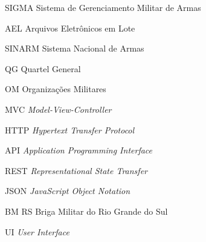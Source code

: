 \begin{siglas}
  \item[SIGMA] Sistema de Gerenciamento Militar de Armas
  \item[AEL] Arquivos Eletrônicos em Lote 
  \item[SINARM] Sistema Nacional de Armas 
  \item[QG] Quartel General
  \item[OM] Organizações Militares
  \item[MVC] \textit{Model-View-Controller}
  \item[HTTP] \textit{Hypertext Transfer Protocol}
  \item[API] \textit{Application Programming Interface}
  \item[REST] \textit{Representational State Transfer}
  \item[JSON] \textit{JavaScript Object Notation}
  \item[BM RS] Briga Militar do Rio Grande do Sul 
  \item[UI] \textit{User Interface}
  
\end{siglas}